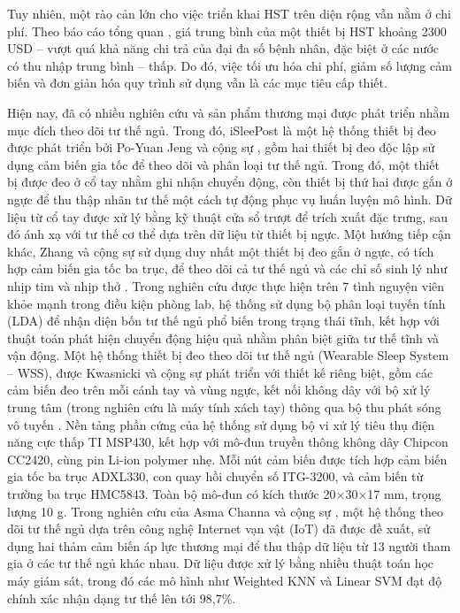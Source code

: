 Tuy nhiên, một rào cản lớn cho việc triển khai HST trên diện rộng vẫn nằm ở chi
phí. Theo báo cáo tổng quan \cite{hst_review}, giá trung bình của một thiết bị
HST khoảng 2300 USD – vượt quá khả năng chi trả của đại đa số bệnh nhân, đặc
biệt ở các nước có thu nhập trung bình – thấp. Do đó, việc tối ưu hóa chi phí,
giảm số lượng cảm biến và đơn giản hóa quy trình sử dụng vẫn là các mục tiêu
cấp thiết.

Hiện nay, đã có nhiều nghiên cứu và sản phẩm thương mại được phát triển nhằm
mục đích theo dõi tư thế ngủ. Trong đó, iSleePost là một hệ thống thiết bị đeo
được phát triển bởi Po-Yuan Jeng và cộng sự \cite{Jeng}, gồm hai thiết bị đeo
độc lập sử dụng cảm biến gia tốc để theo dõi và phân loại tư thế ngủ. Trong đó,
một thiết bị được đeo ở cổ tay nhằm ghi nhận chuyển động, còn thiết bị thứ hai
được gắn ở ngực để thu thập nhãn tư thế một cách tự động phục vụ huấn luyện mô
hình. Dữ liệu từ cổ tay được xử lý bằng kỹ thuật cửa sổ trượt để trích xuất đặc
trưng, sau đó ánh xạ với tư thế cơ thể dựa trên dữ liệu từ thiết bị ngực. Một
hướng tiếp cận khác, Zhang và cộng sự sử dụng duy nhất một thiết bị đeo gắn ở
ngực, có tích hợp cảm biến gia tốc ba trục, để theo dõi cả tư thế ngủ và các
chỉ số sinh lý như nhịp tim và nhịp thở \cite{Zhang_osa}. Trong nghiên cứu được
thực hiện trên 7 tình nguyện viên khỏe mạnh trong điều kiện phòng lab, hệ thống
sử dụng bộ phân loại tuyến tính (LDA) để nhận diện bốn tư thế ngủ phổ biến
trong trạng thái tĩnh, kết hợp với thuật toán phát hiện chuyển động hiệu quả
nhằm phân biệt giữa tư thế tĩnh và vận động. Một hệ thống thiết bị đeo theo dõi
tư thế ngủ (Wearable Sleep System – WSS), được Kwasnicki và cộng sự phát triển
với thiết kế riêng biệt, gồm các cảm biến đeo trên mỗi cánh tay và vùng ngực,
kết nối không dây với bộ xử lý trung tâm (trong nghiên cứu là máy tính xách
tay) thông qua bộ thu phát sóng vô tuyến \cite{kwasnicki2018}. Nền tảng phần
cứng của hệ thống sử dụng bộ vi xử lý tiêu thụ điện năng cực thấp TI MSP430,
kết hợp với mô-đun truyền thông không dây Chipcon CC2420, cùng pin Li-ion
polymer nhẹ. Mỗi nút cảm biến được tích hợp cảm biến gia tốc ba trục ADXL330,
con quay hồi chuyển số ITG-3200, và cảm biến từ trường ba trục HMC5843. Toàn bộ
mô-đun có kích thước 20×30×17 mm, trọng lượng 10 g. Trong nghiên cứu của Asma
Channa và cộng sự \cite{Channa_osa}, một hệ thống theo dõi tư thế ngủ dựa trên
công nghệ Internet vạn vật (IoT) đã được đề xuất, sử dụng hai thảm cảm biến áp
lực thương mại để thu thập dữ liệu từ 13 người tham gia ở các tư thế ngủ khác
nhau. Dữ liệu được xử lý bằng nhiều thuật toán học máy giám sát, trong đó các
mô hình như Weighted KNN và Linear SVM đạt độ chính xác nhận dạng tư thế lên
tới 98,7\%.

